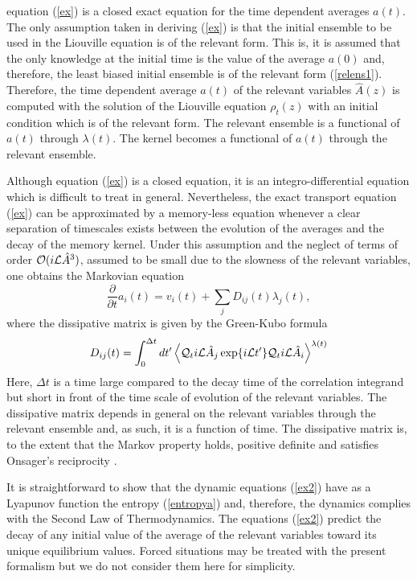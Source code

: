 \documentclass[b5paper,openright,10pt]{book}
\begin{document}
equation   (\ref{ex}) is  a closed  exact equation  for the  time dependent
averages $a(t)$.  The only assumption  taken in deriving (\ref{ex}) is
that the initial  ensemble to be used in the  Liouville equation is of
the relevant form.  This is, it is assumed that  the only knowledge at
the initial  time is the value  of the average $a(0)$  and, therefore,
the  least   biased  initial   ensemble  is   of  the   relevant  form
(\ref{relens1}).  Therefore, the time  dependent average $a(t)$ of the
relevant variables $\hat{A}(z)$  is computed with the  solution of the
Liouville equation $\rho_t(z)$  with an initial condition  which is of
the relevant  form.  The relevant  ensemble is a functional  of $a(t)$
through  $\lambda(t)$.   The kernel  becomes  a  functional of  $a(t)$
through the relevant  ensemble.  

Although equation  (\ref{ex})  is a closed
equation, it is an integro-differential  equation which is difficult to
treat  in   general.   Nevertheless,  the  exact   transport  equation
(\ref{ex}) can  be approximated by  a memory-less equation  whenever a
clear separation  of timescales  exists between the evolution  of the
averages and  the decay of  the memory kernel. Under  this assumption
and the  neglect of terms of  order ${\cal O}( i{\cal L}\hat{A}^3)$,  assumed to be
small due to  the slowness of the relevant variables,  one obtains the
Markovian equation \cite{Grabert1982}
\begin{equation}
  \frac{\partial}{\partial t}a_i(t) = v_i(t) + \sum_j D_{ij}(t) \lambda_j(t),
\label{ex2}
\end{equation}
where  the  dissipative matrix  is  given  by  the Green-Kubo  formula
\begin{equation}
D_{ij}(t)=\int_0^{\Delta t} dt'\left\langle 
{\cal Q}_t i{\cal L}\hat{A}_j\exp\{i{\cal L}t'\}{\cal Q}_t i{\cal L}\hat{A}_i
\right\rangle^{\lambda(t)}
\label{dij}
\end{equation}
Here,  $\Delta t$ is  a  time large  compared  to the  decay  time of  the
correlation  integrand  but  short  in  front of  the  time  scale  of
evolution of  the relevant variables.  The  dissipative matrix depends
in general  on the  relevant variables  through the  relevant ensemble
and, as such, it is a function of time.  The dissipative matrix is, to
the  extent that  the  Markov property  holds,  positive definite  and
satisfies Onsager's reciprocity \cite{Grabert1982}. 

It is straightforward  to show that the  dynamic equations (\ref{ex2})
have  as  a  Lyapunov   function  the  entropy  (\ref{entropya})  and,
therefore,   the   dynamics   complies   with  the   Second   Law   of
Thermodynamics.  The  equations (\ref{ex2})  predict the decay  of any
initial value  of the  average of the  relevant variables  toward its
unique equilibrium  values. Forced situations may  be treated
with the present  formalism \cite{Grabert1982} but we  do not consider
them here for simplicity.
\end{document}
